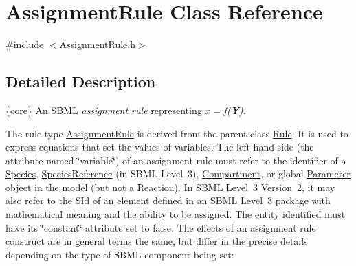 \hypertarget{class_assignment_rule}{}\section{Assignment\+Rule Class Reference}
\label{class_assignment_rule}


{\ttfamily \#include $<$Assignment\+Rule.\+h$>$}



\subsection{Detailed Description}
\{core\} An S\+B\+ML {\itshape assignment rule} representing {\itshape x = f({\bfseries Y})}.

The rule type \hyperlink{class_assignment_rule}{Assignment\+Rule} is derived from the parent class \hyperlink{class_rule}{Rule}. It is used to express equations that set the values of variables. The left-\/hand side (the attribute named \char`\"{}variable\char`\"{}) of an assignment rule must refer to the identifier of a \hyperlink{class_species}{Species}, \hyperlink{class_species_reference}{Species\+Reference} (in S\+B\+ML Level~3), \hyperlink{class_compartment}{Compartment}, or global \hyperlink{class_parameter}{Parameter} object in the model (but not a \hyperlink{class_reaction}{Reaction}). In S\+B\+ML Level~3 Version~2, it may also refer to the S\+Id of an element defined in an S\+B\+ML Level~3 package with mathematical meaning and the ability to be assigned. The entity identified must have its \char`\"{}constant\char`\"{} attribute set to {\ttfamily false}. The effects of an assignment rule construct are in general terms the same, but differ in the precise details depending on the type of S\+B\+ML component being set\+: 
